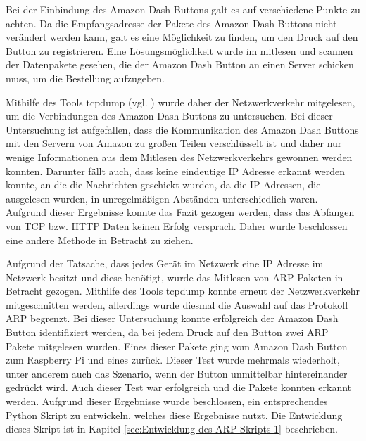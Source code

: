 Bei der Einbindung des Amazon Dash Buttons galt es auf verschiedene Punkte zu achten. 
Da die Empfangsadresse der Pakete des Amazon Dash Buttons nicht verändert werden kann, galt es eine Möglichkeit zu finden, um den Druck auf den Button zu registrieren.
Eine Lösungsmöglichkeit wurde im mitlesen und scannen der Datenpakete gesehen, die der Amazon Dash Button an einen Server schicken muss, um die Bestellung aufzugeben.

Mithilfe des Tools tcpdump (vgl. \cite{.tcpdump}) wurde daher der Netzwerkverkehr mitgelesen, um die Verbindungen des Amazon Dash Buttons zu untersuchen. 
Bei dieser Untersuchung ist aufgefallen, dass die Kommunikation des Amazon Dash Buttons mit den Servern von Amazon zu großen Teilen verschlüsselt ist und daher nur wenige Informationen aus dem Mitlesen des Netzwerkverkehrs gewonnen werden konnten. 
Darunter fällt auch, dass keine eindeutige \ac{IP} Adresse erkannt werden konnte, an die die Nachrichten geschickt wurden, da die \ac{IP} Adressen, die ausgelesen wurden, in unregelmäßigen Abständen unterschiedlich waren.
Aufgrund dieser Ergebnisse konnte das Fazit gezogen werden, dass das Abfangen von \ac{TCP} bzw. \ac{HTTP} Daten keinen Erfolg versprach.
Daher wurde beschlossen eine andere Methode in Betracht zu ziehen.

Aufgrund der Tatsache, dass jedes Gerät im Netzwerk eine \ac{IP} Adresse im Netzwerk besitzt und diese benötigt, wurde das Mitlesen von \ac{ARP} Paketen in Betracht gezogen.
Mithilfe des Tools tcpdump konnte erneut der Netzwerkverkehr mitgeschnitten werden, allerdings wurde diesmal die Auswahl auf das Protokoll \ac{ARP} begrenzt. 
Bei dieser Untersuchung konnte erfolgreich der Amazon Dash Button identifiziert werden, da bei jedem Druck auf den Button zwei \ac{ARP} Pakete mitgelesen wurden.
Eines dieser Pakete ging vom Amazon Dash Button zum Raspberry Pi und eines zurück. 
Dieser Test wurde mehrmals wiederholt, unter anderem auch das Szenario, wenn der Button unmittelbar hintereinander gedrückt wird. 
Auch dieser Test war erfolgreich und die Pakete konnten erkannt werden.
Aufgrund dieser Ergebnisse wurde beschlossen, ein entsprechendes Python Skript zu entwickeln, welches diese Ergebnisse nutzt.
Die Entwicklung dieses Skript ist in Kapitel \ref{sec:Entwicklung des ARP Skripts-1} beschrieben. 
